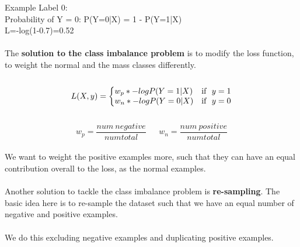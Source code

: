 \documentclass[a4paper,12pt]{article}
\begin{document}
Example Label 0:\\
Probability of Y = 0: P(Y=0|X) = 1 - P(Y=1|X)\\
L=-log(1-0.7)=0.52
\\
\\
The \textbf{solution to the class imbalance problem} is to modify the loss function, to weight the normal and the mass classes differently. 
\\\\
\begin{equation}
L(X,y)=\left\{
\begin{array}{@{}ll@{}}
w_p * -log P(Y=1|X) & \text{if}\ \ y=1 \nonumber \\
w_n * -log P(Y=0|X) & \text{if}\ \ y=0
\end{array}\right.
\end{equation}
\\
\[ w_p=\frac{num\ negative}{num total} \ \ \textrm{ }
\ \ w_n=\frac{num\ positive}{num total} \]
\\
We want to weight the positive examples more, such that they can have an equal contribution overall to the loss, as the normal examples.\\
\\
Another solution to tackle the class imbalance problem is \textbf{re-sampling}. The basic idea here is to re-sample the dataset such that we have an equal number of negative and positive examples.\\
\\
We do this excluding negative examples and duplicating positive examples.
\end{document}
